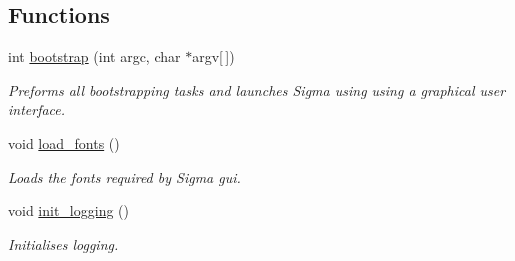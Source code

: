 \subsection*{Functions}
\begin{DoxyCompactItemize}
\item 
\hypertarget{namespacesigma_1_1gui_af29d2039a3ce3982f2f7cec59b9a4678}{}int \hyperlink{namespacesigma_1_1gui_af29d2039a3ce3982f2f7cec59b9a4678}{bootstrap} (int argc, char $\ast$argv\mbox{[}$\,$\mbox{]})\label{namespacesigma_1_1gui_af29d2039a3ce3982f2f7cec59b9a4678}

\begin{DoxyCompactList}\small\item\em Preforms all bootstrapping tasks and launches Sigma using using a graphical user interface. \end{DoxyCompactList}\item 
\hypertarget{namespacesigma_1_1gui_ac69e307732a86f3ecf06e62cf37f7715}{}void \hyperlink{namespacesigma_1_1gui_ac69e307732a86f3ecf06e62cf37f7715}{load\+\_\+fonts} ()\label{namespacesigma_1_1gui_ac69e307732a86f3ecf06e62cf37f7715}

\begin{DoxyCompactList}\small\item\em Loads the font\textquotesingle{}s required by Sigma gui. \end{DoxyCompactList}\item 
\hypertarget{namespacesigma_1_1gui_a8f3a98f909e24d78a4b6d95516e787b3}{}void \hyperlink{namespacesigma_1_1gui_a8f3a98f909e24d78a4b6d95516e787b3}{init\+\_\+logging} ()\label{namespacesigma_1_1gui_a8f3a98f909e24d78a4b6d95516e787b3}

\begin{DoxyCompactList}\small\item\em Initialises logging. \end{DoxyCompactList}\end{DoxyCompactItemize}
